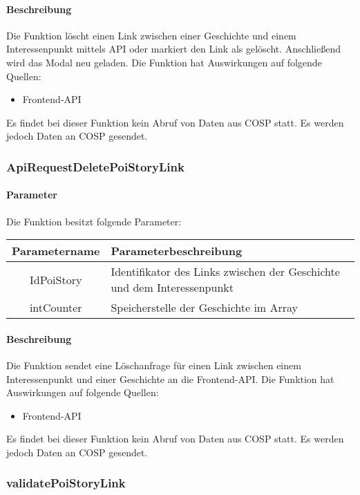 \paragraph{Beschreibung} Die Funktion löscht einen Link zwischen einer Geschichte und einem Interessenpunkt mittels API oder markiert den Link als gelöscht. Anschließend wird das Modal neu geladen. Die Funktion hat Auswirkungen auf folgende Quellen:
\begin{itemize}
	\item Frontend-API
\end{itemize}
Es findet bei dieser Funktion kein Abruf von Daten aus {\glqq COSP\grqq} statt. Es werden jedoch Daten an {\glqq COSP\grqq} gesendet.
\subsubsection{ApiRequestDeletePoiStoryLink}
\paragraph{Parameter} Die Funktion besitzt folgende Parameter:
\begin{table}[H]
	\begin{tabular}{|c|p{11cm}|}
		\hline
		\textbf{Parametername} & \textbf{Parameterbeschreibung} \\ \hline
		IdPoiStory & Identifikator des Links zwischen der Geschichte und dem Interessenpunkt \\ \hline
		intCounter & Speicherstelle der Geschichte im Array \\ \hline
	\end{tabular}
\end{table}
\paragraph{Beschreibung} Die Funktion sendet eine Löschanfrage für einen Link zwischen einem Interessenpunkt und einer Geschichte an die Frontend-API. Die Funktion hat Auswirkungen auf folgende Quellen:
\begin{itemize}
	\item Frontend-API
\end{itemize}
Es findet bei dieser Funktion kein Abruf von Daten aus {\glqq COSP\grqq} statt. Es werden jedoch Daten an {\glqq COSP\grqq} gesendet.
\subsubsection{validatePoiStoryLink}
